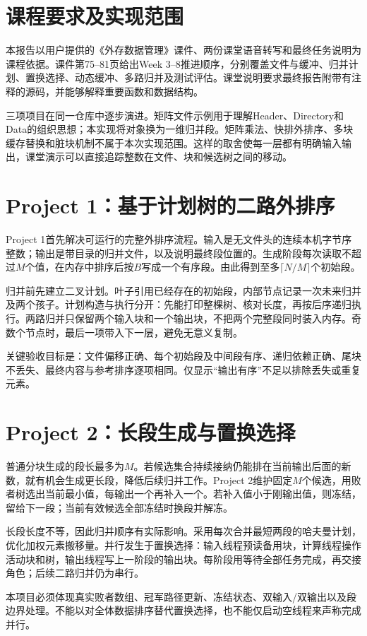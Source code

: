 \section{课程要求及实现范围}
本报告以用户提供的《外存数据管理》课件、两份课堂语音转写和最终任务说明为课程依据。课件第75--81页给出Week 3--8推进顺序，分别覆盖文件与缓冲、归并计划、置换选择、动态缓冲、多路归并及测试评估。课堂说明要求最终报告附带有注释的源码，并能够解释重要函数和数据结构。

三项项目在同一仓库中逐步演进。矩阵文件示例用于理解Header、Directory和Data的组织思想；本实现将对象换为一维归并段。矩阵乘法、快排外排序、多块缓存替换和脏块机制不属于本次实现范围。这样的取舍使每一层都有明确输入输出，课堂演示可以直接追踪整数在文件、块和候选树之间的移动。

\section{Project 1：基于计划树的二路外排序}
Project 1首先解决可运行的完整外排序流程。输入是无文件头的连续本机字节序整数；输出是带目录的归并文件，以及说明最终段位置的。生成阶段每次读取不超过$M$个值，在内存中排序后按$B$写成一个有序段。由此得到至多$\lceil N/M\rceil$个初始段。

归并前先建立二叉计划。叶子引用已经存在的初始段，内部节点记录一次未来归并及两个孩子。计划构造与执行分开：先能打印整棵树、核对长度，再按后序递归执行。两路归并只保留两个输入块和一个输出块，不把两个完整段同时装入内存。奇数个节点时，最后一项带入下一层，避免无意义复制。

关键验收目标是：文件偏移正确、每个初始段及中间段有序、递归依赖正确、尾块不丢失、最终内容与参考排序逐项相同。仅显示“输出有序”不足以排除丢失或重复元素。

\section{Project 2：长段生成与置换选择}
普通分块生成的段长最多为$M$。若候选集合持续接纳仍能排在当前输出后面的新数，就有机会生成更长段，降低后续归并工作。Project 2维护固定$M$个候选，用败者树选出当前最小值，每输出一个再补入一个。若补入值小于刚输出值，则冻结，留给下一段；当前有效候选全部冻结时换段并解冻。

长段长度不等，因此归并顺序有实际影响。采用每次合并最短两段的哈夫曼计划，优化加权元素搬移量。并行发生于置换选择：输入线程预读备用块，计算线程操作活动块和树，输出线程写上一阶段的输出块。每阶段用等待全部任务完成，再交接角色；后续二路归并仍为串行。

本项目必须体现真实败者数组、冠军路径更新、冻结状态、双输入/双输出以及段边界处理。不能以对全体数据排序替代置换选择，也不能仅启动空线程来声称完成并行。

